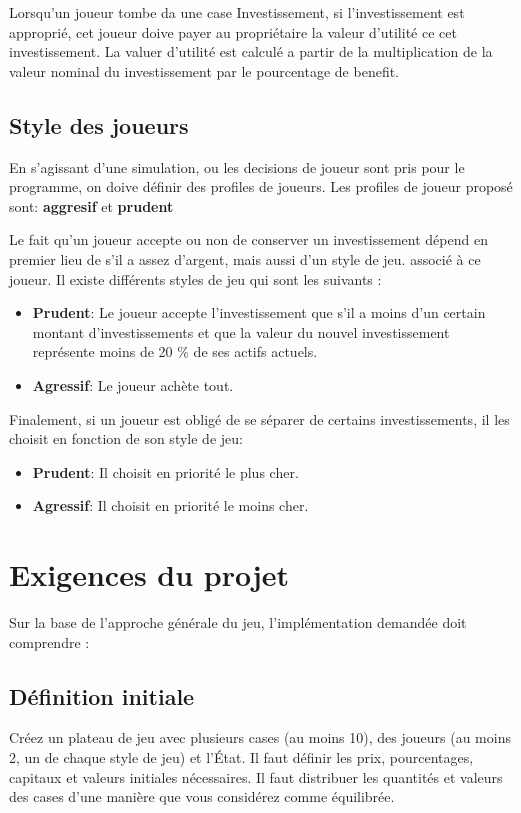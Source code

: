 \documentclass[12pt]{article}
\begin{document}
	Lorsqu'un joueur tombe da une case Investissement, si l'investissement est approprié, cet joueur doive payer au propriétaire la valeur d'utilité ce cet investissement. 
	La valuer d'utilité est calculé a partir de la multiplication de la valeur nominal du investissement par le pourcentage de benefit. 
	 
	
    \subsection{Style des joueurs}
    En s'agissant d'une simulation, ou les decisions de joueur sont pris pour le programme, on doive définir des profiles de joueurs.
    Les profiles de joueur proposé sont: \textbf{aggresif} et \textbf{prudent}
    
    Le fait qu'un joueur accepte ou non de conserver un investissement dépend en premier lieu 
    de s'il a assez d'argent, mais aussi d'un style de jeu. associé à ce joueur. 
    Il existe différents styles de jeu qui sont les suivants :
        \begin{itemize}
           \item \textbf{Prudent}: Le joueur accepte l'investissement que s'il a moins d'un certain montant 
           d'investissements et que la valeur du nouvel investissement représente moins de 20 \% de ses
           actifs actuels.
           \item  \textbf{Agressif}: Le joueur achète tout.
        \end{itemize}

    Finalement, si un joueur est obligé de se séparer de certains investissements, 
    il les choisit en fonction de son style de jeu:
        \begin{itemize}
            \item \textbf{Prudent}: Il choisit en priorité le plus cher.
            \item \textbf{Agressif}: Il choisit en priorité le moins cher.
        \end{itemize}
        
\section{Exigences du projet}
Sur la base de l'approche générale du jeu, l'implémentation demandée doit comprendre :

\subsection{Définition initiale}
Créez un plateau de jeu avec plusieurs cases (au moins 10), des joueurs (au moins 2, un de
chaque style de jeu) et l'État. Il faut définir les prix, pourcentages, capitaux et valeurs initiales nécessaires. 
Il faut distribuer les quantités et valeurs des cases d'une manière que vous considérez comme équilibrée.
\end{document}

